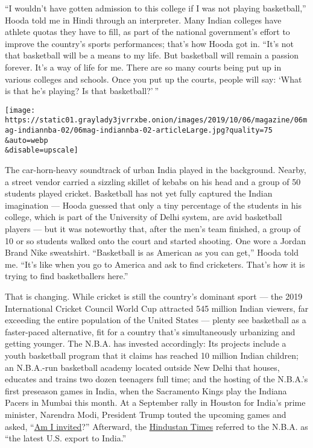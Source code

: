 ``I wouldn't have gotten admission to this college if I was not playing
basketball,'' Hooda told me in Hindi through an interpreter. Many Indian
colleges have athlete quotas they have to fill, as part of the national
government's effort to improve the country's sports performances; that's
how Hooda got in. ``It's not that basketball will be a means to my life.
But basketball will remain a passion forever. It's a way of life for me.
There are so many courts being put up in various colleges and schools.
Once you put up the courts, people will say: `What is that he's playing?
Is that basketball?' ''

\texttt{[image: https://static01.graylady3jvrrxbe.onion/images/2019/10/06/magazine/06mag-indiannba-02/06mag-indiannba-02-articleLarge.jpg?quality=75\\\&auto=webp\\\&disable=upscale]}

The car-horn-heavy soundtrack of urban India played in the background.
Nearby, a street vendor carried a sizzling skillet of kebabs on his head
and a group of 50 students played cricket. Basketball has not yet fully
captured the Indian imagination --- Hooda guessed that only a tiny
percentage of the students in his college, which is part of the
University of Delhi system, are avid basketball players --- but it was
noteworthy that, after the men's team finished, a group of 10 or so
students walked onto the court and started shooting. One wore a Jordan
Brand Nike sweatshirt. ``Basketball is as American as you can get,''
Hooda told me. ``It's like when you go to America and ask to find
cricketers. That's how it is trying to find basketballers here.''

That is changing. While cricket is still the country's dominant sport
--- the 2019 International Cricket Council World Cup attracted 545
million Indian viewers, far exceeding the entire population of the
United States --- plenty see basketball as a faster-paced alternative,
fit for a country that's simultaneously urbanizing and getting younger.
The N.B.A. has invested accordingly: Its projects include a youth
basketball program that it claims has reached 10 million Indian
children; an N.B.A.-run basketball academy located outside New Delhi
that houses, educates and trains two dozen teenagers full time; and the
hosting of the N.B.A.'s first preseason games in India, when the
Sacramento Kings play the Indiana Pacers in Mumbai this month. At a
September rally in Houston for India's prime minister, Narendra Modi,
President Trump touted the upcoming games and asked,
``\href{https://www.youtube.com/watch?v=iXwnrB0OkrU}{Am I invited}?''
Afterward, the
\href{https://www.hindustantimes.com/india-news/am-i-invited-mr-prime-minister-trump-on-india-s-first-nba-game/story-15hW9MfyEAwyO1FtrpPT4M.html}{Hindustan
Times} referred to the N.B.A. as ``the latest U.S. export to India.''

